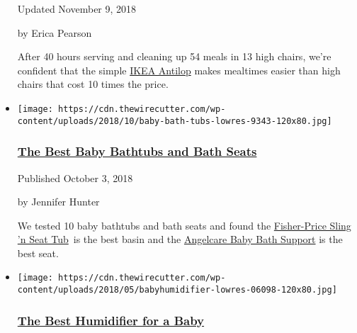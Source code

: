 \begin{itemize}
  Updated November 9, 2018

  by Erica Pearson

  After 40 hours serving and cleaning up 54 meals in 13 high chairs,
  we're confident that the simple
  \href{https://www.nytimes3xbfgragh.onion/wirecutter/out/link/19979/107138/4/47673/?merchant=IKEA}{IKEA
  Antilop} makes mealtimes easier than high chairs that cost 10 times
  the price.
\item
  \href{https://www.nytimes3xbfgragh.onion/wirecutter/reviews/best-baby-bathtubs-and-bath-seats/}{}

  \texttt{[image: https://cdn.thewirecutter.com/wp-content/uploads/2018/10/baby-bath-tubs-lowres-9343-120x80.jpg]}

  \hypertarget{the-best-baby-bathtubs-and-bath-seats}{%
  \subsubsection{\texorpdfstring{\href{https://www.nytimes3xbfgragh.onion/wirecutter/reviews/best-baby-bathtubs-and-bath-seats/}{The
  Best Baby Bathtubs and Bath
  Seats}}{The Best Baby Bathtubs and Bath Seats}}\label{the-best-baby-bathtubs-and-bath-seats}}

  Published October 3, 2018

  by Jennifer Hunter

  We tested 10 baby bathtubs and bath seats and found the
  \href{https://www.nytimes3xbfgragh.onion/wirecutter/out/link/28567/148095/4/81527/?merchant=BuyBuy\%20Baby}{Fisher-Price
  Sling 'n Seat Tub}~is the best basin and the
  \href{https://www.nytimes3xbfgragh.onion/wirecutter/out/link/28568/162168/4/81529/?merchant=BuyBuy\%20Baby}{Angelcare
  Baby Bath Support} is the best seat.
\item
  \href{https://www.nytimes3xbfgragh.onion/wirecutter/reviews/best-humidifier-for-a-baby/}{}

  \texttt{[image: https://cdn.thewirecutter.com/wp-content/uploads/2018/05/babyhumidifier-lowres-06098-120x80.jpg]}

  \hypertarget{the-best-humidifier-for-a-baby}{%
  \subsubsection{\texorpdfstring{\href{https://www.nytimes3xbfgragh.onion/wirecutter/reviews/best-humidifier-for-a-baby/}{The
  Best Humidifier for a
  Baby}}{The Best Humidifier for a Baby}}\label{the-best-humidifier-for-a-baby}}


\end{itemize}
